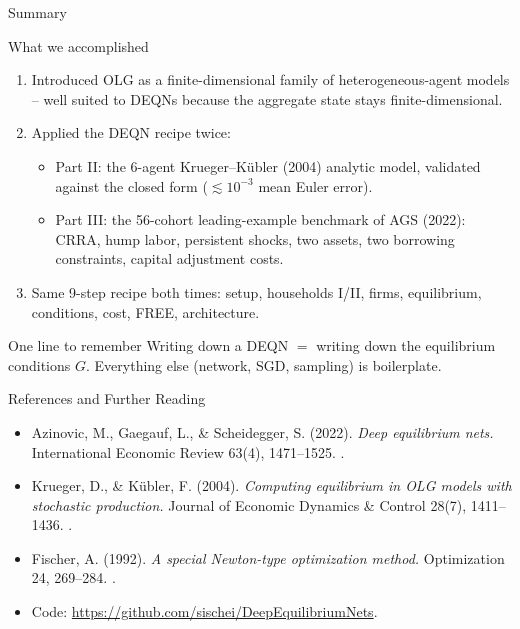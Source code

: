 \documentclass[aspectratio=169,11pt]{beamer}
\newcommand{\emphc}[1]{\textcolor{harvardcrimson}{#1}}
\begin{document}
\begin{frame}{Summary}
\footnotesize
\begin{block}{What we accomplished}
\vspace{-2pt}\begin{enumerate}\itemsep1pt
    \item Introduced OLG as a finite-dimensional family of heterogeneous-agent models -- well suited to DEQNs because the aggregate state stays finite-dimensional.
    \item Applied the DEQN recipe \emphc{twice}:
    \begin{itemize}\itemsep0pt
        \item \emphc{Part II:} the 6-agent Krueger--K\"ubler (2004) analytic model, validated against the closed form ($\lesssim 10^{-3}$ mean Euler error).
        \item \emphc{Part III:} the 56-cohort leading-example benchmark of AGS (2022): CRRA, hump labor, persistent shocks, two assets, two borrowing constraints, capital adjustment costs.
    \end{itemize}
    \item \emphc{Same 9-step recipe} both times: setup, households I/II, firms, equilibrium, conditions, cost, FREE, architecture.
\end{enumerate}
\end{block}

\vspace{-2pt}
\begin{alertblock}{One line to remember}
\emphc{Writing down a DEQN $=$ writing down the equilibrium conditions $G$.}  Everything else (network, SGD, sampling) is boilerplate.
\end{alertblock}
\end{frame}


\begin{frame}{References and Further Reading}
\small
\begin{itemize}\itemsep3pt
    \item Azinovic, M., Gaegauf, L., \& Scheidegger, S. (2022). \emph{Deep equilibrium nets.} International Economic Review 63(4), 1471--1525.  .

    \item Krueger, D., \& K\"ubler, F. (2004). \emph{Computing equilibrium in OLG models with stochastic production.} Journal of Economic Dynamics \& Control 28(7), 1411--1436.  .

    \item Fischer, A. (1992). \emph{A special Newton-type optimization method.} Optimization 24, 269--284.  .

    \item Code: \scriptsize\url{https://github.com/sischei/DeepEquilibriumNets}.
\end{itemize}
\end{frame}
\end{document}
